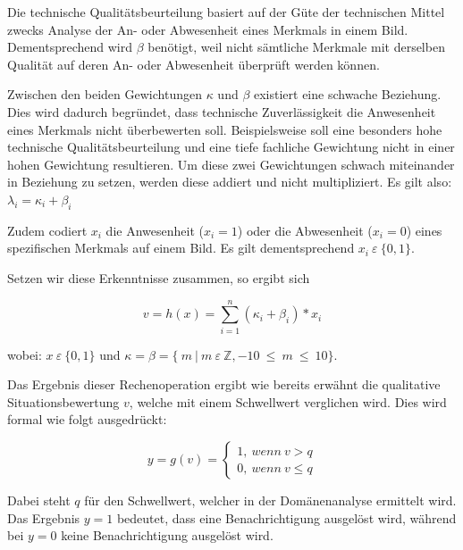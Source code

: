 Die technische Qualitätsbeurteilung basiert auf der Güte der technischen Mittel zwecks Analyse der An- oder Abwesenheit eines Merkmals in einem Bild. Dementsprechend wird $\beta$ benötigt, weil nicht sämtliche Merkmale mit derselben Qualität auf deren An- oder Abwesenheit überprüft werden können.

Zwischen den beiden Gewichtungen $\kappa$ und $\beta$ existiert eine schwache Beziehung. Dies wird dadurch begründet, dass technische Zuverlässigkeit die Anwesenheit eines Merkmals nicht überbewerten soll. Beispielsweise soll eine besonders hohe technische Qualitätsbeurteilung und eine tiefe fachliche Gewichtung nicht in einer hohen Gewichtung resultieren. Um diese zwei Gewichtungen schwach miteinander in Beziehung zu setzen, werden diese addiert und nicht multipliziert. Es gilt also: $\lambda_{i} = \kappa_{i} + \beta_{i}$

Zudem codiert $x_{i}$ die Anwesenheit ($x_{i}=1$) oder die Abwesenheit ($x_{i}=0$) eines spezifischen Merkmals auf einem Bild. Es gilt dementsprechend  $ x_{i} \:  \varepsilon \: \{0,1\}. $ 


Setzen wir diese Erkenntnisse zusammen, so ergibt sich

\begin{equation}\label{Vollständige Linerarkombination zur Geburtsprognose}
v = h(x) = \sum_{i=1}^n (\kappa_{i}+\beta_{i}) *x_{i}
\end{equation}

wobei:  $ x \:  \varepsilon \: \{0,1\} $ und $\kappa = \beta = \{ \:  m \: | \:  m \:  \varepsilon \:  \mathbb{Z}, -10 \:  \leq \: m \: \leq \:  10\} $.

Das Ergebnis dieser Rechenoperation ergibt wie bereits erwähnt die qualitative Situationsbewertung $v$, welche mit einem Schwellwert verglichen wird. Dies wird formal wie folgt ausgedrückt:

\begin{equation}\label{Vollständige Linerarkombination zur Geburtsprognose: Schwellwertanalyse}
y = g(v) =\begin{cases}
			1,\: wenn \: v > q\\
			0,\: wenn \: v \leq q
\end{cases}
\end{equation}

Dabei steht $q$ für den Schwellwert, welcher in der Domänenanalyse ermittelt wird. Das Ergebnis $y=1$ bedeutet, dass eine Benachrichtigung ausgelöst wird, während bei $y=0$ keine Benachrichtigung ausgelöst wird.

